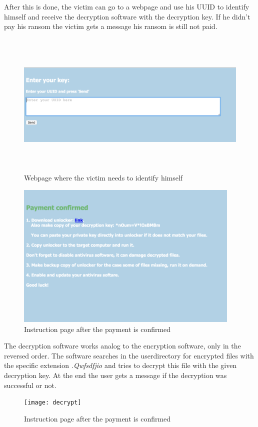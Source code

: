 After this is done, the victim can go to a webpage and use his UUID to identify himself and receive the decryption software with the decryption key.
If he didn't pay his ransom the victim gets a message his ransom is still not paid.

\begin{figure}[H]
    \centering 
    \includegraphics[height=7cm]{inputuuid}
    \caption{Webpage where the victim needs to identify himself}
    \label{instructions}
\end{figure}
\begin{figure}[H]
    \centering 
    \includegraphics[height=7cm]{paid_instructions}
    \caption{Instruction page after the payment is confirmed}
    \label{instructions}
\end{figure}

The decryption software works analog to the encryption software, only in the reversed order. The software searches in the userdirectory for encrypted files with the specific extension \textit{.Qwfsdfjio} and tries to decrypt this file with the given decryption key. At the end the user gets a message if the decryption was successful or not.


\begin{figure}[H]
    \centering 
    \texttt{[image: decrypt]}
    \caption{Instruction page after the payment is confirmed}
    \label{instructions}
\end{figure}